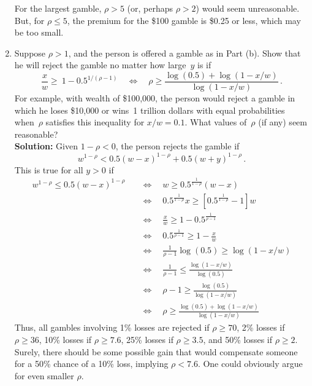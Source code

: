 \documentclass[11pt]{article}
\newcommand{\sol}{\textbf{Solution:} \hspace{2ex}}
\theoremstyle{definition}
\begin{document}
\begin{enumerate}
\noindent For the largest gamble, $\rho > 5$ (or, perhaps $\rho>2$) would seem unreasonable.  But, for $\rho \leq 5$, the premium for the \$100 gamble is \$0.25 or less, which may be too small.
   \item Suppose $\rho>1$, and the person is offered a gamble as in Part (b).  Show that he will reject the gamble no matter how large~$y$ is if
        $$\frac{x}{w} \geq~1 - 0.5^{1/(\rho-1)} \quad \Leftrightarrow \quad \rho \geq \frac{\log (0.5) + \log (1-x/w)}{\log (1-x/w)}\,.$$
        For example, with wealth of \$100,000, the person would reject a gamble in which he loses \$10,000 or wins~1 trillion dollars with equal probabilities when~$\rho$ satisfies this inequality for $x/w=0.1$.
        What values of~$\rho$ (if any) seem reasonable?\\
        \noindent\sol Given $1-\rho<0$, the person rejects the gamble if
        $$w^{1-\rho} < 0.5(w-x)^{1-\rho} + 0.5(w+y)^{1-\rho}\,.$$
        This is true for all $y>0$ if
        \begin{align*}
        w^{1-\rho} \leq 0.5(w-x)^{1-\rho} & \quad\Leftrightarrow\quad  w \geq 0.5^{\frac{1}{1-\rho}}(w-x)\\
        & \quad\Leftrightarrow\quad 0.5^{\frac{1}{1-\rho}}x \geq \left[0.5^{\frac{1}{1-\rho}}-1\right]w \\
        & \quad\Leftrightarrow\quad \frac{x}{w} \geq 1- 0.5^{\frac{1}{\rho-1}}\\
        & \quad\Leftrightarrow\quad 0.5^{\frac{1}{\rho-1}} \geq 1-\frac{x}{w} \\
        & \quad\Leftrightarrow\quad \frac{1}{\rho-1} \log (0.5) \geq \log (1-x/w)\\
        & \quad\Leftrightarrow\quad \frac{1}{\rho-1}  \leq \frac{\log (1-x/w)}{\log (0.5)}\\
        & \quad\Leftrightarrow\quad \rho - 1 \geq \frac{\log (0.5)}{\log (1-x/w)}\\
        & \quad\Leftrightarrow\quad \rho \geq \frac{\log (0.5)+\log (1-x/w)}{\log (1-x/w)}
        \end{align*}
        Thus, all gambles involving 1\% losses are rejected if $\rho\geq7 0$,  2\% losses  if $\rho\geq 36$, 10\% losses if $\rho\geq 7.6$, 25\% losses if $\rho\geq 3.5$, and 50\% losses if $\rho\geq 2$.  Surely, there should be some possible gain that would compensate someone for a 50\% chance of a 10\% loss, implying $\rho < 7.6$.  One could obviously argue for even smaller $\rho$.
        \end{enumerate}
\end{document}
